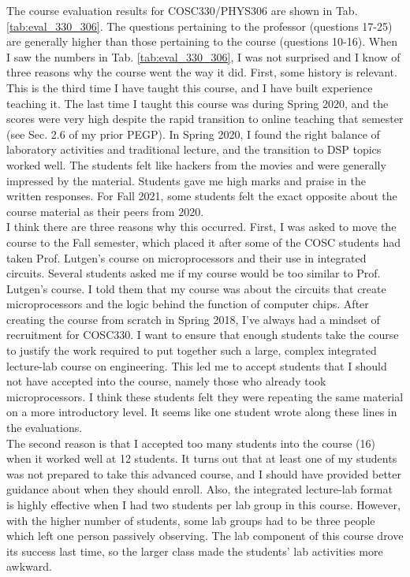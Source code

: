 \documentclass[../../main.tex]{subfiles}
\begin{document}
The course evaluation results for COSC330/PHYS306 are shown in Tab. \ref{tab:eval_330_306}.  The questions pertaining to the professor (questions 17-25) are generally higher than those pertaining to the course (questions 10-16).  When I saw the numbers in Tab. \ref{tab:eval_330_306}, I was not surprised and I know of three reasons why the course went the way it did.  First, some history is relevant.  This is the third time I have taught this course, and I have built experience teaching it.  The last time I taught this course was during Spring 2020, and the scores were very high despite the rapid transition to online teaching that semester (see Sec. 2.6 of my prior PEGP).  In Spring 2020, I found the right balance of laboratory activities and traditional lecture, and the transition to DSP topics worked well.  The students felt like hackers from the movies and were generally impressed by the material.  Students gave me high marks and praise in the written responses.  For Fall 2021, some students felt the exact opposite about the course material as their peers from 2020.
\\
\vspace{0.25cm}
I think there are three reasons why this occurred.  First, I was asked to move the course to the Fall semester, which placed it after some of the COSC students had taken Prof. Lutgen's course on microprocessors and their use in integrated circuits.  Several students asked me if my course would be too similar to Prof. Lutgen's course.  I told them that my course was about the circuits that create microprocessors and the logic behind the function of computer chips.  After creating the course from scratch in Spring 2018, I've always had a mindset of recruitment for COSC330.  I want to ensure that enough students take the course to justify the work required to put together such a large, complex integrated lecture-lab course on engineering.  This led me to accept students that I should not have accepted into the course, namely those who already took microprocessors.  I think these students felt they were repeating the same material on a more introductory level.  It seems like one student wrote along these lines in the evaluations.
\\
\vspace{0.25cm}
The second reason is that I accepted too many students into the course (16) when it worked well at 12 students.  It turns out that at least one of my students was not prepared to take this advanced course, and I should have provided better guidance about when they should enroll.  Also, the integrated lecture-lab format is highly effective when I had two students per lab group in this course.  However, with the higher number of students, some lab groups had to be three people which left one person passively observing.  The lab component of this course drove its success last time, so the larger class made the students' lab activities more awkward.
\end{document}
